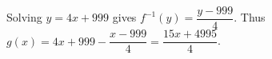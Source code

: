 Solving $y=4x+999$ gives $f^{-1}(y)=\dfrac{y-999}{4}$. Thus $g(x)=4x+999-\dfrac{x-999}{4}=\boxed{\dfrac{15x+4995}{4}}$.

